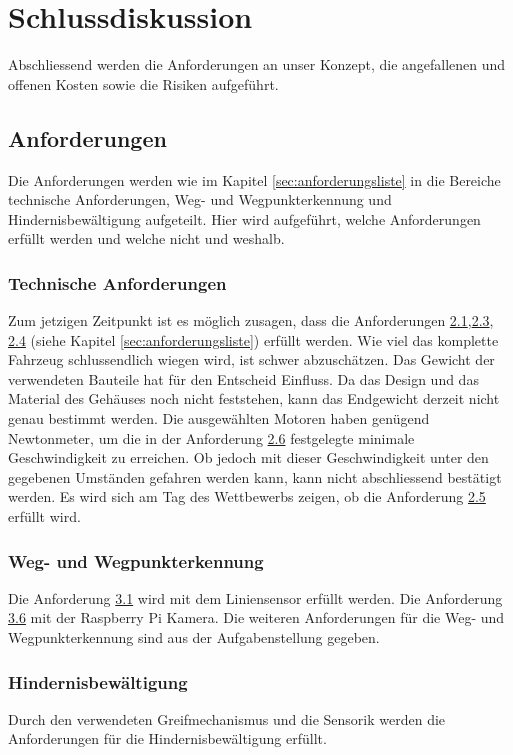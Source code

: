 \documentclass[../main.tex]{subfiles}
\begin{document}
\newpage
\section{Schlussdiskussion}

Abschliessend werden die Anforderungen an unser Konzept, die angefallenen und offenen Kosten sowie die Risiken aufgeführt. 
\subsection{Anforderungen}
Die Anforderungen werden wie im Kapitel \ref{sec:anforderungsliste} in die Bereiche technische Anforderungen, Weg- und Wegpunkterkennung und Hindernisbewältigung aufgeteilt. Hier wird aufgeführt, welche Anforderungen erfüllt werden und welche nicht und weshalb.

\subsubsection{Technische Anforderungen}
Zum jetzigen Zeitpunkt ist es möglich zusagen, dass die Anforderungen \hyperlink{A2.1}{2.1},\hyperlink{A2.3}{2.3}, \hyperlink{A2.4}{2.4} (siehe Kapitel \ref{sec:anforderungsliste}) erfüllt werden. Wie viel das komplette Fahrzeug schlussendlich wiegen wird, ist schwer abzuschätzen. Das Gewicht der verwendeten Bauteile hat für den Entscheid Einfluss. Da das Design und das Material des Gehäuses noch nicht feststehen, kann das Endgewicht derzeit nicht genau bestimmt werden. Die ausgewählten Motoren haben genügend Newtonmeter, um die in der Anforderung \hyperlink{A2.6}{2.6} festgelegte minimale Geschwindigkeit zu erreichen. Ob jedoch mit dieser Geschwindigkeit unter den gegebenen Umständen gefahren werden kann, kann nicht abschliessend bestätigt werden.
Es wird sich am Tag des Wettbewerbs zeigen, ob die Anforderung \hyperlink{A2.5}{2.5} erfüllt wird.

\subsubsection{Weg- und Wegpunkterkennung}
Die Anforderung \hyperlink{A3.1}{3.1} wird mit dem Liniensensor erfüllt werden. Die Anforderung \hyperlink{A3.6}{3.6} mit der Raspberry Pi Kamera. Die weiteren Anforderungen für die Weg- und Wegpunkterkennung sind aus der Aufgabenstellung gegeben.

\subsubsection{Hindernisbewältigung}
Durch den verwendeten Greifmechanismus und die Sensorik werden die Anforderungen für die Hindernisbewältigung erfüllt.
\end{document}
